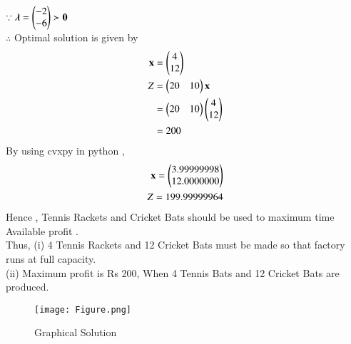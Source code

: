 \documentclass[journal,12pt,twocolumn]{IEEEtran}
\begin{document}
$\because \boldsymbol{\lambda}=\begin{pmatrix}-2 \\ -6\end{pmatrix} \succ \mathbf{0} $
\\
$\therefore$ Optimal solution is given by
\begin{align}
    \mathbf{x} &= \begin{pmatrix}4\\12\end{pmatrix} \\
    Z &= \begin{pmatrix}20 & 10\end{pmatrix}\mathbf{x} \\
    &= \begin{pmatrix}20 & 10\end{pmatrix}\begin{pmatrix}4 \\ 12\end{pmatrix} \\
    &= 200
\end{align}
By using cvxpy in python ,
\begin{align}
    \mathbf{x}=\begin{pmatrix}3.99999998\\12.0000000\end{pmatrix}\\
    Z = 199.99999964
\end{align}
Hence , Tennis Rackets and  Cricket Bats should be used to maximum time Available profit .\\
Thus,
(i) 4 Tennis Rackets and 12 Cricket Bats must be made so that factory runs at full capacity.\\
(ii) Maximum profit is Rs 200, When 4 Tennis Bats and 12 Cricket Bats are produced.
\begin{figure}[!ht]
\centering
\texttt{[image: Figure.png]}
\caption{Graphical Solution}
\label{fig: Graphical Solution}	
\end{figure}
\end{document}
